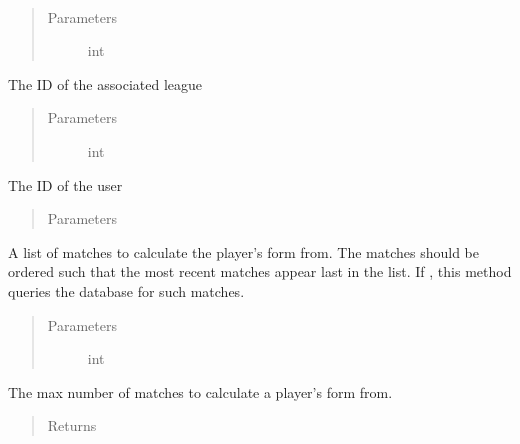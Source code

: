 \documentclass[letterpaper,10pt,english]{sphinxmanual}
\begin{document}
\begin{fulllineitems}
\label{\detokenize{tiger_leagues/models/readme:tiger_leagues.models.league_model.get_players_league_stats}}~\begin{quote}\begin{description}
\item[{Parameters}] \leavevmode
{} \textendash{} int

\end{description}\end{quote}

The ID of the associated league
\begin{quote}\begin{description}
\item[{Parameters}] \leavevmode
{} \textendash{} int

\end{description}\end{quote}

The ID of the user
\begin{quote}\begin{description}
\item[{Parameters}] \leavevmode
{} \textendash{} 

\end{description}\end{quote}

A list of matches to calculate the player’s form from. The matches should be 
ordered such that the most recent matches appear last in the list.
If , this method queries the database for such matches.
\begin{quote}\begin{description}
\item[{Parameters}] \leavevmode
{} \textendash{} int

\end{description}\end{quote}

The max number of matches to calculate a player’s form from.
\begin{quote}\begin{description}
\item[{Returns}] \leavevmode
{}


\end{description}
\end{quote}
\end{fulllineitems}
\end{document}
